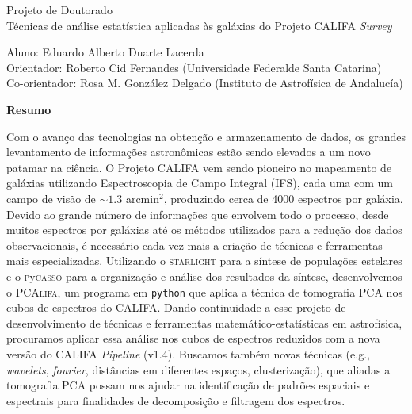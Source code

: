 \documentclass[a4paper,12pt]{article}
\newcommand\pycasso{\textsc{p}y\textsc{casso}\xspace}
\newcommand\pcalifa{PCA\textsc{lifa}\xspace}
\def\starlight{\textsc{starlight}\xspace}      %
\begin{document}
\begin{center}
	\LARGE{Projeto de Doutorado}\\ \bigskip\large{Técnicas de análise estatística aplicadas às galáxias do Projeto CALIFA {\em Survey}}
\end{center}

\vspace{1cm}

\begin{flushleft}
	Aluno: Eduardo Alberto Duarte Lacerda\\
	Orientador: Roberto Cid Fernandes (Universidade Federalde Santa Catarina)\\
	Co-orientador: Rosa M. González Delgado (Instituto de Astrofísica de Andalucía)
\end{flushleft}

\begin{center}
	\textbf{Resumo}
\end{center}
Com o avanço das tecnologias na obtenção e armazenamento de dados, os grandes levantamento de informações astronômicas estão sendo elevados a um novo
patamar na ciência. O Projeto CALIFA vem sendo pioneiro no mapeamento de galáxias utilizando Espectroscopia de Campo Integral (IFS), cada uma com um
campo de visão de $\sim1.3$ arcmin${}^2$, produzindo cerca de 4000 espectros por galáxia. Devido ao grande número de informações que envolvem todo o
processo, desde muitos espectros por galáxias até os métodos utilizados para a redução dos dados observacionais, é necessário cada vez mais a criação
de técnicas e ferramentas mais especializadas. Utilizando o \starlight para a síntese de populações estelares e o \pycasso para a organização e
análise dos resultados da síntese, desenvolvemos o \pcalifa, um programa em \texttt{python} que aplica a técnica de tomografia PCA nos cubos de
espectros do CALIFA. Dando continuidade a esse projeto de desenvolvimento de técnicas e ferramentas matemático-estatísticas em astrofísica, procuramos
aplicar essa análise nos cubos de espectros reduzidos com a nova versão do CALIFA {\em Pipeline} (v1.4). Buscamos também novas técnicas (e.g., {\em
wavelets}, {\em fourier}, distâncias em diferentes espaços, clusterização), que aliadas a tomografia PCA possam nos ajudar na identificação de padrões
espaciais e espectrais para finalidades de decomposição e filtragem dos espectros.
	
\end{document}
